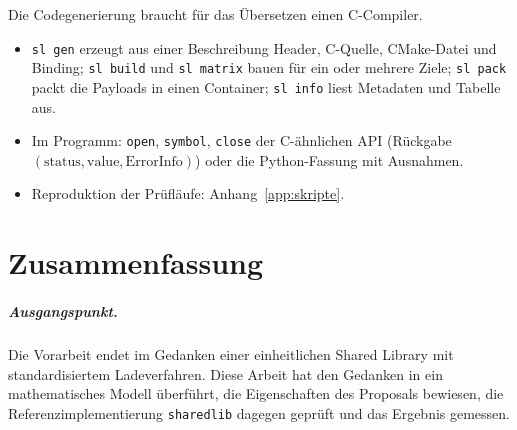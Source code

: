 \documentclass[a4paper,12pt,twoside]{report}
\DeclareRobustCommand{\_}{\ifmmode\mbox{\textunderscore}\else\textunderscore\allowbreak{}\fi}
\theoremstyle{definition}
\begin{document}
Die Codegenerierung braucht für das Übersetzen einen C-Compiler.
\begin{itemize}
	\item \texttt{sl gen} erzeugt aus einer Beschreibung Header, C-Quelle, CMake-Datei und Binding; \texttt{sl build} und \texttt{sl matrix} bauen für ein oder mehrere Ziele; \texttt{sl pack} packt die Payloads in einen Container; \texttt{sl info} liest Metadaten und Tabelle aus.
	\item Im Programm: \texttt{open}, \texttt{symbol}, \texttt{close} der C-ähnlichen API (Rückgabe $(\mathrm{status},\mathrm{value},\mathrm{ErrorInfo})$) oder die Python-Fassung mit Ausnahmen.
	\item Reproduktion der Prüfläufe: Anhang~\ref{app:skripte}.
\end{itemize}


\chapter{Zusammenfassung}
\label{chap:zusammenfassung}

\paragraph{Ausgangspunkt.} Die Vorarbeit \cite{epp2026csubgraph} endet im Gedanken einer einheitlichen Shared Library mit standardisiertem Ladeverfahren. Diese Arbeit hat den Gedanken in ein mathematisches Modell überführt, die Eigenschaften des Proposals bewiesen, die Referenzimplementierung \texttt{sharedlib} dagegen geprüft und das Ergebnis gemessen.
\end{document}
